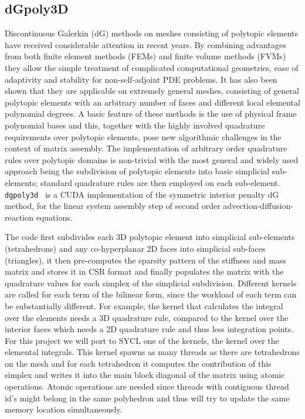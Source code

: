 \documentclass[../main]{subfiles}
\begin{document}
\subsection{dGpoly3D}\label{sec:dgpoly3d}

Discontinuous Galerkin (dG) methods on meshes consisting of polytopic elements have received considerable attention in recent years.
By combining advantages from both finite element methods (FEMs) and finite volume methods (FVMs) they allow the simple treatment of complicated computational geometries, ease of adaptivity and stability for non-self-adjoint PDE problems.
It has also been shown that they are applicable on extremely general meshes, consisting of general polytopic elements with an arbitrary number of faces and different local elemental polynomial degrees.
A basic feature of these methods is the use of physical frame polynomial bases and this, together with the highly involved quadrature requirements over polytopic elements, pose new algorithmic challenges in the context of matrix assembly.
The implementation of arbitrary order quadrature rules over polytopic domains is non-trivial with the most general and widely used approach being the subdivision of polytopic elements into basic simplicial sub-elements; standard quadrature rules are then employed on each sub-element.
\texttt{dgpoly3d}~\cite{dong_gpu-accelerated_2021} is a CUDA implementation of the symmetric interior penalty dG method, for the linear system assembly step of second order advection-diffusion-reaction equations.

The code first subdivides each 3D polytopic element into simplicial sub-elements (tetrahedrons) and any co-hyperplanar 2D faces into simplicial sub-faces (triangles), it then pre-computes the sparsity pattern of the stiffness and mass matrix and stores it in CSR format and finally populates the matrix with the quadrature values for each simplex of the simplicial subdivision.
Different kernels are called for each term of the bilinear form, since the workload of each term can be substantially different.
For example, the kernel that calculates the integral over the elements needs a 3D quadrature rule, compared to the kernel over the interior faces which needs a 2D quadrature rule and thus less integration points.
For this project we will port to SYCL one of the kernels, the kernel over the elemental integrals.
This kernel spawns as many threads as there are tetrahedrons on the mesh and for each tetrahedron it computes the contribution of this simplex and writes it into the main block diagonal of the matrix using atomic operations.
Atomic operations are needed since threads with contiguous thread id's might belong in the same polyhedron and thus will try to update the same memory location simultaneously.
\end{document}
